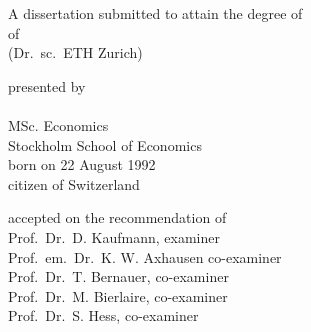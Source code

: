 \documentclass[%
    twoside, openright, titlepage, numbers=noenddot,%
    cleardoublepage=empty,%
    abstract=false,%
    BCOR=5.5mm, paper=a5, fontsize=10pt,%
]{mythesis}
\begin{document}
\begin{titlepage}
    \begin{center}
        \large
        \begingroup
        \endgroup

        \hfill

        \vfill

        \begingroup
            \spacedallcaps{\myTitle}
        \endgroup

        \vfill

        \begingroup
            A dissertation submitted to attain the degree of\\
            \vspace{0.5em}
            of
             \\
            (Dr.\ sc.\ ETH Zurich)
        \endgroup

        \vfill

        \begingroup
            presented by\\
            \vspace{0.5em}
            \spacedlowsmallcaps{\myName}\\
            MSc. Economics \\ Stockholm School of Economics\\
            \vspace{0.5em}
            born on 22 August 1992\\
            citizen of Switzerland
        \endgroup

        \vfill

        \begingroup
            accepted on the recommendation of\\
            \vspace{0.5em}
            Prof.\ Dr.\ D. Kaufmann, examiner\\
            Prof.\ em.\ Dr.\ K. W. Axhausen co-examiner\\
            Prof.\ Dr.\ T. Bernauer, co-examiner\\
            Prof.\ Dr.\ M. Bierlaire, co-examiner\\
            Prof.\ Dr.\ S. Hess, co-examiner
        \endgroup

        \vfill

        \myTime%

        \vfill
    \end{center}
\end{titlepage}
\thispagestyle{empty}
\end{document}
